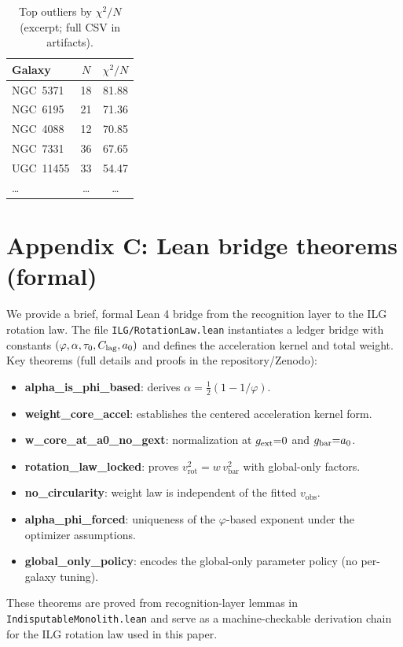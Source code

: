 \documentclass[12pt,a4paper]{article}
\begin{document}
\begin{table}[h]
\centering
\caption{Top outliers by $\chi^2/N$ (excerpt; full CSV in artifacts).}
\label{tab:outliers_top20}
\begin{tabular}{lcc}
\toprule
Galaxy & $N$ & $\chi^2/N$ \\
\midrule
NGC~5371 & 18 & 81.88 \\
NGC~6195 & 21 & 71.36 \\
NGC~4088 & 12 & 70.85 \\
NGC~7331 & 36 & 67.65 \\
UGC~11455 & 33 & 54.47 \\
\dots & \dots & \dots \\
\bottomrule
\end{tabular}
\end{table}

\section*{Appendix C: Lean bridge theorems (formal)}
\noindent We provide a brief, formal Lean 4 bridge from the recognition layer to the ILG rotation law. The file \texttt{ILG/RotationLaw.lean} instantiates a ledger bridge with constants $(\varphi,\alpha,\tau_0,C_{\rm lag},a_0)$ and defines the acceleration kernel and total weight. Key theorems (full details and proofs in the repository/Zenodo):
\begin{itemize}
  \item \textbf{alpha\_is\_phi\_based}: derives $\alpha=\tfrac12(1-1/\varphi)$.
  \item \textbf{weight\_core\_accel}: establishes the centered acceleration kernel form.
  \item \textbf{w\_core\_at\_a0\_no\_gext}: normalization at $g_{\rm ext}{=}0$ and $g_{\rm bar}{=}a_0$.
  \item \textbf{rotation\_law\_locked}: proves $v_\mathrm{rot}^2=w\,v_\mathrm{bar}^2$ with global-only factors.
  \item \textbf{no\_circularity}: weight law is independent of the fitted $v_\mathrm{obs}$.
  \item \textbf{alpha\_phi\_forced}: uniqueness of the $\varphi$-based exponent under the optimizer assumptions.
  \item \textbf{global\_only\_policy}: encodes the global-only parameter policy (no per-galaxy tuning).
\end{itemize}
These theorems are proved from recognition-layer lemmas in \texttt{IndisputableMonolith.lean} and serve as a machine-checkable derivation chain for the ILG rotation law used in this paper.
\end{document}

